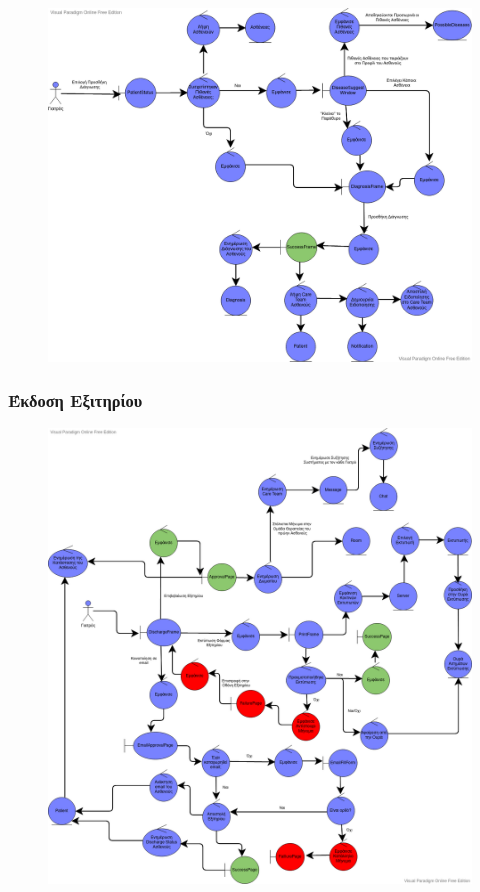 \documentclass{article}
\begin{document}
\vspace{0.2cm}

\begin{figure}[!htb]
        \centering
        \includegraphics[width=1.1\textwidth]{Patient Card - Diagnosis.png}
\end{figure}

\newpage

\subsubsection{Έκδοση Εξιτηρίου}

\vspace{0.2cm}

\begin{figure}[!htb]
        \centering
        \includegraphics[width=1.1\textwidth]{Patient Card - Discharge.png}
\end{figure}
\end{document}
